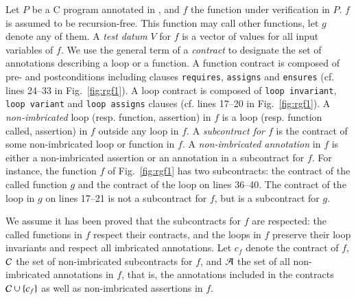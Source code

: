 Let $P$ be a C program annotated in \eacsl, 
and $f$ the function under verification in $P$.
$f$ is assumed to be recursion-free.
This function may call other functions, let $g$ denote any of them.
A \emph{test datum} $V$ for $f$ is a vector of values for all input variables of $f$.
We use the general term of a \emph{contract} 
to designate the set of \eacsl annotations describing a loop or a function.
A function contract is composed of pre- and postconditions including \eacsl clauses
\lstinline{requires}, \lstinline{assigns} and
\lstinline{ensures}  (cf. lines 24--33 in Fig.~\ref{fig:rgf1}).
A loop contract is composed of \lstinline{loop invariant},
\lstinline{loop variant} and \lstinline{loop assigns} clauses
(cf. lines 17--20 in Fig.~\ref{fig:rgf1}).
A \emph{non-imbricated} loop (resp. function, assertion) in $f$ is a loop
 (resp. function called, assertion) in $f$ outside any loop in
$f$. A \emph{subcontract for $f$} is the contract of some non-imbricated loop or function
 in $f$. A \emph{non-imbricated annotation} in $f$ is either a
non-imbricated assertion or an annotation in a subcontract for $f$.
For instance, the function $f$ of Fig.~\ref{fig:rgf1} has two subcontracts:
the contract of the called function $g$ and the contract of the loop on lines 36--40.
The contract of the loop in $g$ on lines 17--21 is not a subcontract for $f$, but is a subcontract for $g$.

We assume it has been proved that the subcontracts for $f$ are respected:
the called functions in $f$ respect their contracts, and the loops in $f$  preserve their loop invariants
and respect all imbricated annotations.
Let $c_f$ denote the contract of $f$,
${\mathcal{C}}$ the set of non-imbricated subcontracts for $f$,
and ${\mathcal{A}}$ the set of all non-imbricated annotations in $f$, that is, 
the annotations included in the contracts ${\mathcal{C}}\cup\{c_f\}$ as well as non-imbricated  assertions in $f$.


